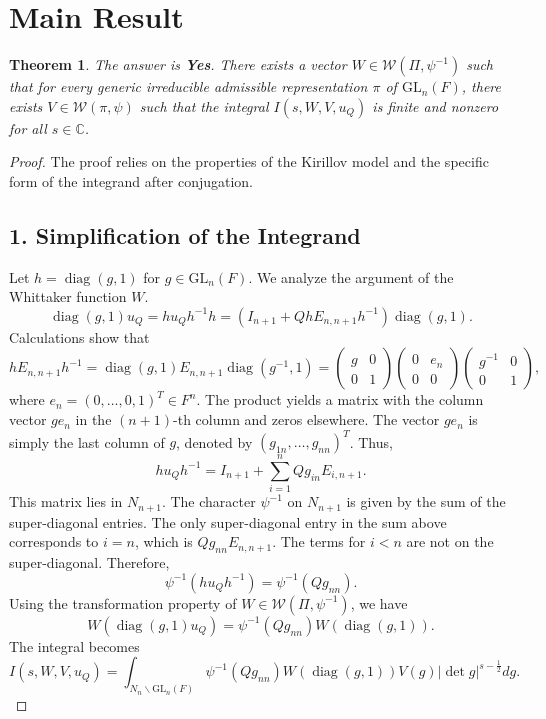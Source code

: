 \documentclass[12pt]{article}
\theoremstyle{plain}
\newtheorem{theorem}{Theorem}
\theoremstyle{definition}
\newcommand{\GL}{\mathrm{GL}}
\newcommand{\diag}{\operatorname{diag}}
\begin{document}
\section{Main Result}

\begin{theorem}
The answer is \textbf{Yes}. There exists a vector $W \in \mathcal{W}(\Pi, \psi^{-1})$ such that for every generic irreducible admissible representation $\pi$ of $\GL_n(F)$, there exists $V \in \mathcal{W}(\pi, \psi)$ such that the integral $I(s, W, V, u_Q)$ is finite and nonzero for all $s \in \mathbb{C}$.
\end{theorem}

\begin{proof}
The proof relies on the properties of the Kirillov model and the specific form of the integrand after conjugation.

\subsection*{1. Simplification of the Integrand}
Let $h = \diag(g, 1)$ for $g \in \GL_n(F)$. We analyze the argument of the Whittaker function $W$.
\[
\diag(g, 1) u_Q = h u_Q h^{-1} h = \left( I_{n+1} + Q h E_{n, n+1} h^{-1} \right) \diag(g, 1).
\]
Calculations show that
\[
h E_{n, n+1} h^{-1} = \diag(g, 1) E_{n, n+1} \diag(g^{-1}, 1) = \begin{pmatrix} g & 0 \\ 0 & 1 \end{pmatrix} \begin{pmatrix} 0 & e_n \\ 0 & 0 \end{pmatrix} \begin{pmatrix} g^{-1} & 0 \\ 0 & 1 \end{pmatrix},
\]
where $e_n = (0, \dots, 0, 1)^T \in F^n$. The product yields a matrix with the column vector $g e_n$ in the $(n+1)$-th column and zeros elsewhere. The vector $g e_n$ is simply the last column of $g$, denoted by $(g_{1n}, \dots, g_{nn})^T$.
Thus,
\[
h u_Q h^{-1} = I_{n+1} + \sum_{i=1}^n Q g_{in} E_{i, n+1}.
\]
This matrix lies in $N_{n+1}$. The character $\psi^{-1}$ on $N_{n+1}$ is given by the sum of the super-diagonal entries. The only super-diagonal entry in the sum above corresponds to $i=n$, which is $Q g_{nn} E_{n, n+1}$. The terms for $i < n$ are not on the super-diagonal.
Therefore,
\[
\psi^{-1}(h u_Q h^{-1}) = \psi^{-1}(Q g_{nn}).
\]
Using the transformation property of $W \in \mathcal{W}(\Pi, \psi^{-1})$, we have
\[
W(\diag(g, 1) u_Q) = \psi^{-1}(Q g_{nn}) W(\diag(g, 1)).
\]
The integral becomes
\[
I(s, W, V, u_Q) = \int_{N_n \backslash \GL_n(F)} \psi^{-1}(Q g_{nn}) W(\diag(g, 1)) V(g) |\det g|^{s-\frac{1}{2}} dg.
\]


\end{proof}
\end{document}
